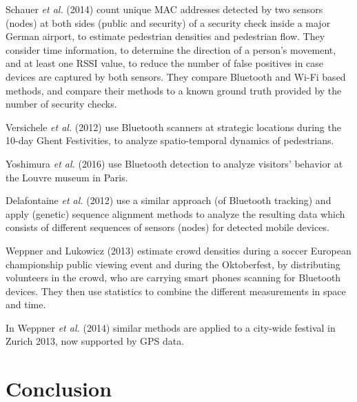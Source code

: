 \documentclass[10pt,a4paper]{article}
\begin{document}
Schauer \textit{et al.} (2014) \cite{schauer:1} count unique MAC addresses detected by two sensors (nodes) at both sides (public and security) of a security check inside a major German airport, to estimate pedestrian densities and pedestrian flow. They consider time information, to determine the direction of a person's movement, and at least one RSSI value, to reduce the number of false positives in case devices are captured by both sensors. They compare Bluetooth and Wi-Fi based methods, and compare their methods to a known ground truth provided by the number of security checks.

Versichele \textit{et al.} (2012) \cite{versichele:1} use Bluetooth scanners at strategic locations during the 10-day Ghent Festivities, to analyze spatio-temporal dynamics of pedestrians. 

Yoshimura \textit{et al.} (2016) \cite{yoshimura:1} use Bluetooth detection to analyze visitors' behavior at the Louvre museum in Paris.

Delafontaine \textit{et al.} (2012) \cite{delafontaine:1} use a similar approach (of Bluetooth tracking) and apply (genetic) sequence alignment methods to analyze the resulting data which consists of different sequences of sensors (nodes) for detected mobile devices.

Weppner and Lukowicz (2013) \cite{weppner:1} estimate crowd densities during a soccer European championship public viewing event and during the Oktoberfest, by distributing volunteers in the crowd, who are carrying smart phones scanning for Bluetooth devices. They then use statistics to combine the different measurements in space and time.

In Weppner \textit{et al.} (2014) \cite{weppner:2} similar methods are applied to a city-wide festival in Zurich 2013, now supported by GPS data.



\section{Conclusion}





\end{document}
